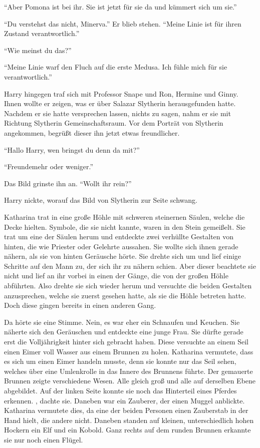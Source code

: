 \enquote{Aber Pomona ist bei ihr. Sie ist jetzt für sie da und kümmert sich um sie.}

\enquote{Du verstehst das nicht, Minerva.} Er blieb stehen. \enquote{Meine Linie ist für ihren Zustand verantwortlich.}

\enquote{Wie meinst du das?}

\enquote{Meine Linie warf den Fluch auf die erste Medusa. Ich fühle mich für sie verantwortlich.}

Harry hingegen traf sich mit Professor Snape und Ron, Hermine und Ginny. Ihnen wollte er zeigen, was er über Salazar Slytherin herausgefunden hatte. Nachdem er sie hatte versprechen lassen, nichts zu sagen, nahm er sie mit Richtung Slytherin Gemeinschaftsraum. Vor dem Porträt von Slytherin angekommen, begrüßt dieser ihn jetzt etwas freundlicher.


\enquote{Hallo Harry, wen bringst du denn da mit?}

\enquote{Freunde\abs mehr oder weniger.}

Das Bild grinste ihn an. \enquote{Wollt ihr rein?}

Harry nickte, worauf das Bild von Slytherin zur Seite schwang.

\trenn

Katharina trat in eine große Höhle mit schweren steinernen Säulen, welche die Decke hielten. Symbole, die sie nicht kannte, waren in den Stein gemeißelt. Sie trat um eine der Säulen herum und entdeckte zwei verhüllte Gestalten von hinten, die wie Priester oder Gelehrte aussahen. Sie wollte sich ihnen gerade nähern, als sie von hinten Geräusche hörte. Sie drehte sich um und lief einige Schritte auf den Mann zu, der sich ihr zu nähern schien. Aber dieser beachtete sie nicht und lief an ihr vorbei in einen der Gänge, die von der großen Höhle abführten. Also drehte sie sich wieder herum und versuchte die beiden Gestalten anzusprechen, welche sie zuerst gesehen hatte, als sie die Höhle betreten hatte. Doch diese gingen bereits in einen anderen Gang.

Da hörte sie eine Stimme. Nein, es war eher ein Schnaufen und Keuchen. Sie näherte sich den Geräuschen und entdeckte eine junge Frau. Sie dürfte gerade erst die Volljährigkeit hinter sich gebracht haben. Diese versuchte an einem Seil einen Eimer voll Wasser aus einem Brunnen zu holen. Katharina vermutete, dass es sich um einen Eimer handeln musste, denn sie konnte nur das Seil sehen, welches über eine Umlenkrolle in das Innere des Brunnens führte. Der gemauerte Brunnen zeigte verschiedene Wesen. Alle gleich groß und alle auf derselben Ebene abgebildet. Auf der linken Seite konnte sie noch das Hinterteil eines Pferdes erkennen. , dachte sie. Daneben war ein Zauberer, der einen Muggel anblickte. Katharina vermutete dies, da eine der beiden Personen einen Zauberstab in der Hand hielt, die andere nicht. Daneben standen auf kleinen, unterschiedlich hohen Hockern ein Elf und ein Kobold. Ganz rechts auf dem runden Brunnen erkannte sie nur noch einen Flügel.

